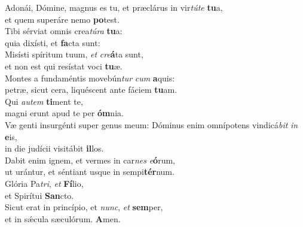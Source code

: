 \evenverse Adonái, Dómine, magnus es tu, et præclárus in vir\textit{tú}\textit{te} \textbf{tu}a,~\*\\
\evenverse et quem superáre nemo \textbf{po}test.\\
\oddverse Tibi sérviat omnis crea\textit{tú}\textit{ra} \textbf{tu}a:~\*\\
\oddverse quia dixísti, et \textbf{fa}cta sunt:\\
\evenverse Misísti spíritum tuum, \textit{et} \textit{cre}\textbf{á}ta sunt,~\*\\
\evenverse et non est qui resístat voci \textbf{tu}æ.\\
\oddverse Montes a fundaméntis movebún\textit{tur} \textit{cum} \textbf{a}quis:~\*\\
\oddverse petræ, sicut cera, liquéscent ante fáciem \textbf{tu}am.\\
\evenverse Qui \textit{au}\textit{tem} \textbf{ti}ment te,~\*\\
\evenverse magni erunt apud te per \textbf{óm}nia.\\
\oddverse Væ genti insurgénti super genus meum: Dóminus enim omnípotens vindicá\textit{bit} \textit{in} \textbf{e}is,~\*\\
\oddverse in die judícii visitábit \textbf{il}los.\\
\evenverse Dabit enim ignem, et vermes in car\textit{nes} \textit{e}\textbf{ó}rum,~\*\\
\evenverse ut urántur, et séntiant usque in sempi\textbf{tér}num.\\
\oddverse Glória Pa\textit{tri}, \textit{et} \textbf{Fí}lio,~\*\\
\oddverse et Spirítui \textbf{San}cto.\\
\evenverse Sicut erat in princípio, et \textit{nunc}, \textit{et} \textbf{sem}per,~\*\\
\evenverse et in sǽcula sæculórum. \textbf{A}men.\\
